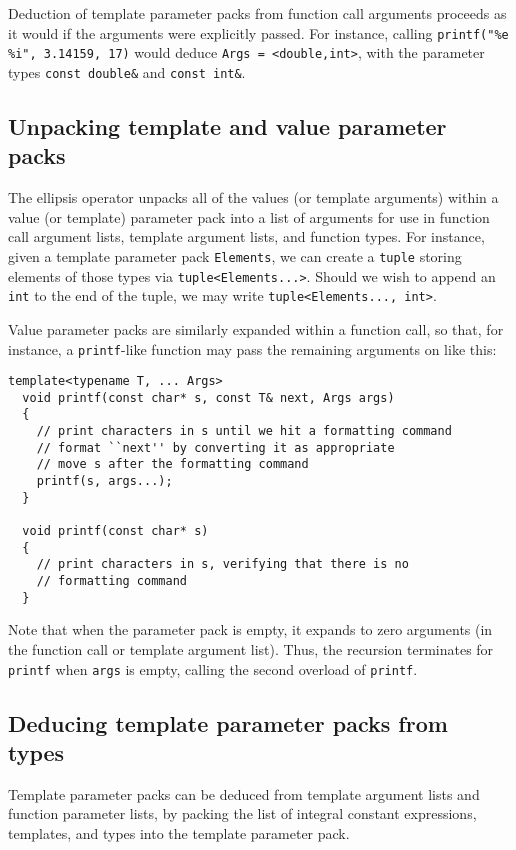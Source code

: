 \documentclass{article}
\begin{document}
Deduction of template parameter packs from function call arguments
proceeds as it would if the arguments were explicitly passed. For
instance, calling \texttt{printf("\%e \%i", 3.14159, 17)} would deduce
\texttt{Args = <double,int>}, with the parameter types \texttt{const
  double\&} and \texttt{const int\&}.

\subsection{Unpacking template and value parameter packs}
The ellipsis operator unpacks all of the values (or template
arguments) within a value (or template) parameter pack into a list of
arguments for use in function call argument lists, template argument
lists, and function types. For instance, given a template parameter pack
{\tt Elements}, we can create a {\tt tuple} storing elements of those
types via {\tt tuple<Elements...>}. Should we wish to append an {\tt int}
to the end of the tuple, we may write {\tt tuple<Elements..., int>}.

Value parameter packs are similarly expanded within a function call,
so that, for instance, a {\tt printf}-like function may pass the
remaining arguments on like this:
\begin{verbatim}
template<typename T, ... Args>
  void printf(const char* s, const T& next, Args args)
  {
    // print characters in s until we hit a formatting command
    // format ``next'' by converting it as appropriate
    // move s after the formatting command
    printf(s, args...); 
  }

  void printf(const char* s)
  {
    // print characters in s, verifying that there is no 
    // formatting command
  }
\end{verbatim}

Note that when the parameter pack is empty, it expands to zero
arguments (in the function call or template argument list). Thus, the
recursion terminates for \texttt{printf} when {\tt args} is empty,
calling the second overload of \texttt{printf}.

\subsection{Deducing template parameter packs from types}
Template parameter packs can be deduced from template argument lists
and function parameter lists, by packing the list of integral constant
expressions, templates, and types into the template parameter pack.
\end{document}
